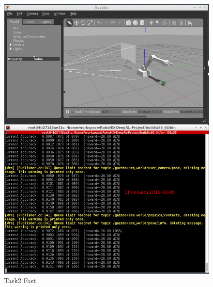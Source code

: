 \documentclass[10pt]{article}
\begin{document}
\begin{figure}[p]
      \centering
      \includegraphics[width=\linewidth]{Assets/Task2_92at100_Learn0p05_2019-03-05_11-59-20.png}
      \caption{Task2 Fast}
      \label{fig:Task2Fast}
\end{figure}
\end{document}
